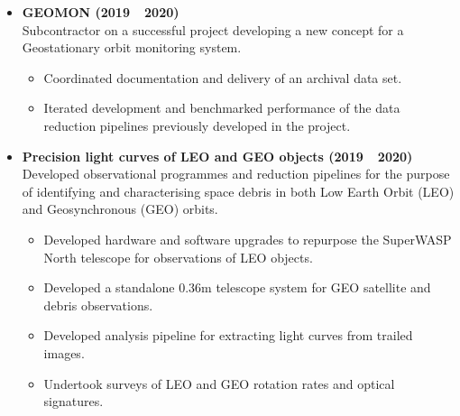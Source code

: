 \documentclass[print]{cv-style}
\begin{document}
\begin{entrylist}
{\begin{itemize}
    \begin{itemize}
        \item Investigated morphological characteristics of tumbling debris light curves.
        \item Developed and bench-marked a proof of concept image stacking algorithm.
    \end{itemize}
    \item \textbf{GEOMON (2019~\textendash~2020)}\\
    Subcontractor on a successful  project developing a new concept for a Geostationary orbit monitoring system.
    \begin{itemize}
        \item Coordinated documentation and delivery of an archival data set.
        \item Iterated development and benchmarked performance of the data reduction pipelines previously developed in the  project.
    \end{itemize}
    \item \textbf{Precision light curves of LEO and GEO objects (2019~\textendash~2020)}\\
    Developed observational programmes and reduction pipelines for the purpose of identifying and characterising space debris in both Low Earth Orbit (LEO) and Geosynchronous (GEO) orbits.
    \begin{itemize}
      \item Developed hardware and software upgrades to repurpose the SuperWASP North telescope for observations of LEO objects.
      \item Developed a standalone 0.36m telescope system for GEO satellite and debris observations.
      \item Developed analysis pipeline for extracting light curves from trailed images.
      \item Undertook surveys of LEO and GEO rotation rates and optical signatures.
    \end{itemize}
  \end{itemize}
}
\end{entrylist}
\end{document}
